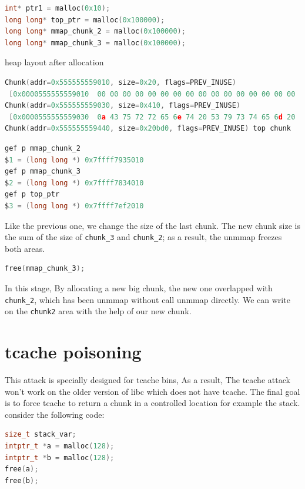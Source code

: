 \documentclass{masterthesis}
\newcommand*\tch{tcache}
\begin{document}
\begin{lstlisting}[language=c,frame=tlrb]
int* ptr1 = malloc(0x10);
long long* top_ptr = malloc(0x100000);
long long* mmap_chunk_2 = malloc(0x100000);
long long* mmap_chunk_3 = malloc(0x100000);
\end{lstlisting}

heap layout after allocation

\begin{lstlisting}[language=c,frame=tlrb]
Chunk(addr=0x555555559010, size=0x20, flags=PREV_INUSE)
 [0x0000555555559010  00 00 00 00 00 00 00 00 00 00 00 00 00 00 00 00 ................]
Chunk(addr=0x555555559030, size=0x410, flags=PREV_INUSE)
 [0x0000555555559030  0a 43 75 72 72 65 6e 74 20 53 79 73 74 65 6d 20 .Current System ]
Chunk(addr=0x555555559440, size=0x20bd0, flags=PREV_INUSE) top chunk
\end{lstlisting}

\begin{lstlisting}[language=c,frame=tlrb]
gef p mmap_chunk_2
$1 = (long long *) 0x7ffff7935010
gef p mmap_chunk_3
$2 = (long long *) 0x7ffff7834010
gef p top_ptr
$3 = (long long *) 0x7ffff7ef2010
\end{lstlisting}

Like the previous one, we change the size of the last chunk. The new chunk size is the sum of the size of \lstinline{chunk_3} and \lstinline{chunk_2}; as a result, the unmmap freezes both areas.

\begin{lstlisting}[language=c,frame=tlrb]
free(mmap_chunk_3);
\end{lstlisting}

In this stage, By allocating a new big chunk, the new one overlapped with \lstinline{chunk_2}, which has been unmmap without call unmmap directly. We can write on the \lstinline{chunk2} area with the help of our new chunk.

\section{\tch{} poisoning}
This attack is specially designed for \tch{} bins, As a result, The \tch{} attack won't work on the older version of libc which does not have \tch{}. The final goal is to force \tch{} to return a chunk in a controlled location for example the stack. consider the following code:

\begin{lstlisting}[language=c,frame=tlrb]
size_t stack_var;
intptr_t *a = malloc(128);
intptr_t *b = malloc(128);
free(a);
free(b);
\end{lstlisting}
\end{document}
